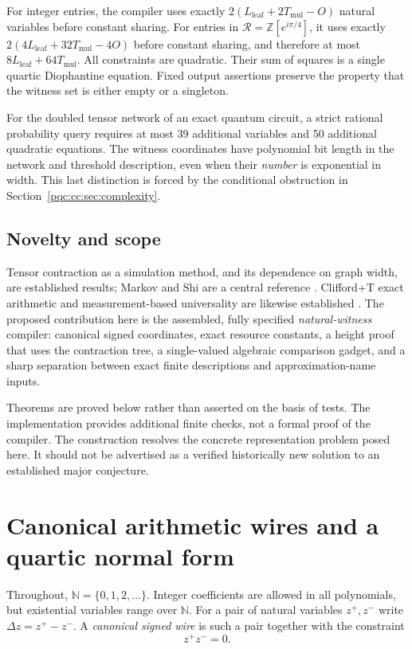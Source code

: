 \documentclass[11pt,letterpaper]{article}
\numberwithin{equation}{section}
\theoremstyle{definition}
\theoremstyle{remark}
\newcommand{\N}{\mathbb N}
\newcommand{\Z}{\mathbb Z}
\newcommand{\srcmark}[1]{\par\noindent{\small\itshape [source~#1]}\par}
\newcommand{\calR}{\mathcal R}
\newcommand{\Lleaf}{L_{\mathrm{leaf}}}
\newcommand{\Tmul}{T_{\mathrm{mul}}}
\begin{document}
For integer entries, the compiler uses exactly $2(\Lleaf+2\Tmul-O)$ natural variables
before constant sharing. For entries in $\calR=\Z[e^{i\pi/4}]$, it uses exactly
$2(4\Lleaf+32\Tmul-4O)$ before constant sharing, and therefore at most $8\Lleaf+64\Tmul$.
All constraints are quadratic. Their sum of squares is a single quartic
Diophantine equation. Fixed output assertions preserve the property that the
witness set is either empty or a singleton.

For the doubled tensor network of an exact quantum circuit, a strict rational
probability query requires at most 39 additional variables and 50 additional
quadratic equations. The witness coordinates have polynomial bit length in the
network and threshold description, even when their \emph{number} is exponential
in width. This last distinction is forced by the conditional obstruction in
Section~\ref{pqc:cc:sec:complexity}.

\subsection{Novelty and scope}

Tensor contraction as a simulation method, and its dependence on graph width,
are established results; Markov and Shi are a central reference \cite{b62s10-MarkovShi}.
Clifford+T exact arithmetic and measurement-based universality are likewise
established \cite{giles-selinger,b62s10-RaussendorfBriegel}. The proposed contribution
here is the assembled, fully specified \emph{natural-witness} compiler: canonical
signed coordinates, exact resource constants, a height proof that uses the
contraction tree, a single-valued algebraic comparison gadget, and a sharp
separation between exact finite descriptions and approximation-name inputs.

Theorems are proved below rather than asserted on the basis of tests. The
implementation provides additional finite checks, not a formal proof of the
compiler. The construction resolves the concrete representation problem posed
here. It should not be advertised as a verified historically new solution to an
established major conjecture.

\section{Canonical arithmetic wires and a quartic normal form}
\label{pqc:cc:sec:wires}
\srcmark{10}

Throughout, $\N=\{0,1,2,\ldots\}$. Integer coefficients are allowed in all
polynomials, but existential variables range over $\N$. For a pair of natural
variables $z^+,z^-$ write $\Delta z=z^+-z^-$. A \emph{canonical signed wire}
is such a pair together with the constraint
\begin{equation}
 z^+z^-=0.
\label{pqc:cc:eq:canonical}
\end{equation}
\end{document}
